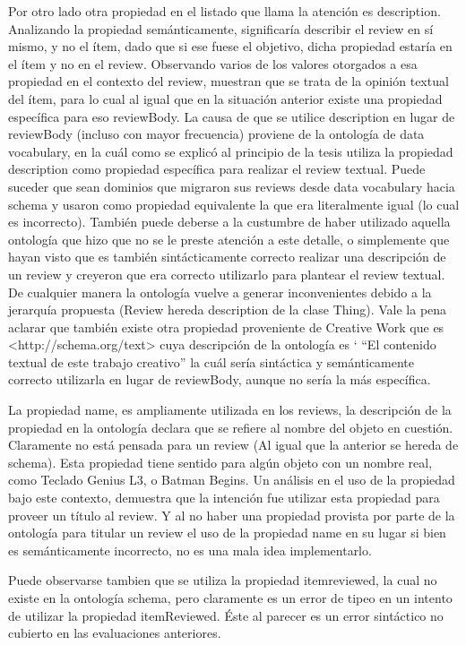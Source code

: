  Por otro lado otra propiedad en el listado que llama la atención es description. Analizando la propiedad semánticamente, significaría describir 
 el review en sí mismo, y no el ítem, dado que si ese fuese el objetivo, dicha propiedad estaría en el ítem y no en el review.
 Observando varios de los valores otorgados a esa propiedad en el contexto del review, muestran que se trata de la opinión textual del ítem, 
 para lo cual al igual que en la situación anterior existe una propiedad específica para eso reviewBody. 
 La causa de que se utilice description en lugar de reviewBody (incluso con mayor frecuencia) proviene de la ontología de data vocabulary, en la cuál 
 como se explicó al principio de la tesis utiliza la propiedad description como propiedad específica para realizar el review textual.
 Puede suceder que sean dominios que migraron sus reviews desde data vocabulary hacia schema y usaron como propiedad equivalente la que 
 era literalmente igual (lo cual es incorrecto). También puede deberse a la custumbre de haber utilizado aquella ontología que hizo que no se le 
 preste atención a este detalle, o simplemente que hayan visto que es también sintácticamente correcto realizar una descripción de un review 
 y creyeron que era correcto utilizarlo para plantear el review textual.
 De cualquier manera la ontología vuelve a generar inconvenientes debido a la jerarquía propuesta (Review hereda description de la clase Thing).
 Vale la pena aclarar que también existe otra propiedad proveniente de Creative Work que es <http://schema.org/text> cuya descripción de la ontología es `
 ``El contenido textual de este trabajo creativo'' la cuál sería sintáctica y semánticamente correcto utilizarla en lugar de reviewBody, aunque 
 no sería la más específica.
 
 La propiedad name, es ampliamente utilizada en los reviews, la descripción de la propiedad en la ontología declara que se refiere al nombre del objeto en cuestión. 
 Claramente no está pensada para un review (Al igual que la anterior se hereda de schema). Esta propiedad tiene sentido para algún objeto con un nombre real, como Teclado Genius L3, o Batman Begins.
 Un análisis en el uso de la propiedad bajo este contexto, demuestra que la intención fue utilizar esta propiedad para proveer un título al review.
 Y al no haber una propiedad provista por parte de la ontología para titular un review el uso de la propiedad name en su lugar si bien 
 es semánticamente incorrecto, no es una mala idea implementarlo.
 
 Puede observarse tambien que se utiliza la propiedad itemreviewed, la cual no existe en la ontología schema, pero claramente es un 
 error de tipeo en un intento de utilizar la propiedad itemReviewed. Éste al parecer es un error sintáctico no cubierto en las evaluaciones 
 anteriores.
 
